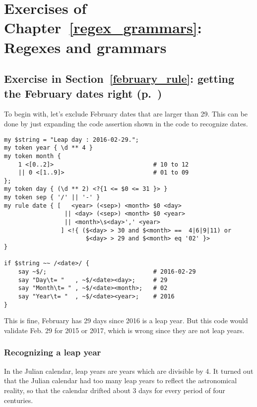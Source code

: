 {\section{Exercises of Chapter~\ref{regex_grammars}: Regexes and grammars}

\subsection{Exercise in Section~\ref{february_rule}: getting the February dates right (p.~\pageref{february_rule})}
\label{sol_february_rule}

To begin with, let's exclude February dates that are 
larger than 29. This can be done by just expanding the 
code assertion shown in the code to recognize dates.

\begin{verbatim}
my $string = "Leap day : 2016-02-29.";                                         
my token year { \d ** 4 }                                        
my token month {   
    1 <[0..2]>                            # 10 to 12                     
    || 0 <[1..9]>                         # 01 to 09                     
};
my token day { (\d ** 2) <?{1 <= $0 <= 31 }> }  
my token sep { '/' || '-' }                                                 
my rule date { [   <year> (<sep>) <month> $0 <day> 
                 || <day> (<sep>) <month> $0 <year> 
                 || <month>\s<day>',' <year>
                ] <!{ ($<day> > 30 and $<month> ==  4|6|9|11) or 
                       $<day> > 29 and $<month> eq '02' }>
}                         

if $string ~~ /<date>/ {
    say ~$/;                              # 2016-02-29
    say "Day\t= "   , ~$/<date><day>;     # 29
    say "Month\t= " , ~$/<date><month>;   # 02
    say "Year\t= "  , ~$/<date><year>;    # 2016
}                    
\end{verbatim}

This is fine, February has 29 days since 2016 is a leap 
year. But this code would validate Feb. 29 for 2015 or 
2017, which is wrong since they are not leap years.

\subsubsection{Recognizing a leap year}

In the Julian calendar, leap years are years which are 
divisible by 4. It turned 
out that the Julian calendar had too many leap years 
to reflect the astronomical reality, so that the 
calendar drifted about 3 days for every period of four 
centuries.

}
